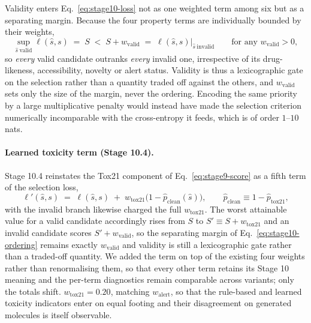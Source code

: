 Validity enters Eq.~\eqref{eq:stage10-loss} not as one weighted term among six
but as a separating margin. Because the four property terms are individually
bounded by their weights,
\begin{equation}
\sup_{\hat{s}\ \mathrm{valid}} \ell(\hat{s},s) \;=\; S
\;<\; S + w_{\mathrm{valid}} \;=\; \ell(\hat{s},s)\big|_{\hat{s}\ \mathrm{invalid}}
\qquad \text{for any } w_{\mathrm{valid}}>0 ,
\label{eq:stage10-ordering}
\end{equation}
so \emph{every} valid candidate outranks \emph{every} invalid one, irrespective
of its drug-likeness, accessibility, novelty or alert status. Validity is thus
a lexicographic gate on the selection rather than a quantity traded off against
the others, and $w_{\mathrm{valid}}$ sets only the size of the margin, never
the ordering. Encoding the same priority by a large multiplicative penalty
would instead have made the selection criterion numerically incomparable with
the cross-entropy it feeds, which is of order $1$--$10$ nats.

\paragraph{Learned toxicity term (Stage 10.4).}
Stage 10.4 reinstates the Tox21 component of Eq.~\eqref{eq:stage9-score} as a
fifth term of the selection loss,
\begin{equation}
\ell'(\hat{s}, s) \;=\; \ell(\hat{s}, s)
\;+\; w_{\mathrm{tox21}}\bigl(1 - \hat{p}_{\mathrm{clean}}(\hat{s})\bigr),
\qquad
\hat{p}_{\mathrm{clean}} \equiv 1 - \hat{p}_{\mathrm{tox21}},
\label{eq:stage104-loss}
\end{equation}
with the invalid branch likewise charged the full $w_{\mathrm{tox21}}$. The
worst attainable value for a valid candidate accordingly rises from $S$ to
$S' \equiv S + w_{\mathrm{tox21}}$ and an invalid candidate scores
$S' + w_{\mathrm{valid}}$, so the separating margin of
Eq.~\eqref{eq:stage10-ordering} remains exactly $w_{\mathrm{valid}}$ and
validity is still a lexicographic gate rather than a traded-off quantity. We
added the term on top of the existing four weights rather than renormalising
them, so that every other term retains its Stage 10 meaning and the per-term
diagnostics remain comparable across variants; only the totals shift.
$w_{\mathrm{tox21}} = 0.20$, matching $w_{\mathrm{alert}}$, so that the
rule-based and learned toxicity indicators enter on equal footing and their
disagreement on generated molecules is itself observable.


